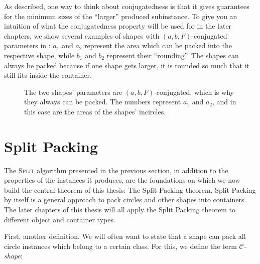 \documentclass[a4paper,style=print,bibliography=totoc,nexus,lnum,extramargin]{tubsbook}
\begin{document}
As described, one way to think about conjugatedness is that it gives guarantees for the minimum sizes of the “larger” produced subinstance. To give you an intuition of what the conjugatedness property will be used for in the later chapters, we show several examples of shapes with $(a,b,F)$-conjugated parameters in : $a_1$ and $a_2$ represent the area which can be packed into the respective shape, while $b_1$ and $b_2$ represent their “rounding”. The shapes can always be packed because if one shape gets larger, it is rounded so much that it still fits inside the container.

\begin{figure}

    \caption{The two shapes' parameters are $(a,b,F)$-conjugated, which is why they always can be packed. The numbers represent $a_1$ and $a_2$, and in this case are the areas of the shapes' incircles.}
    \label{fig:conjugated}
\end{figure}

\section{Split Packing}

The \textsc{Split} algorithm presented in the previous section, in addition to the properties of the instances it produces, are the foundations on which we now build the central theorem of this thesis: The Split Packing theorem. Split Packing by itself is a general approach to pack circles and other shapes into containers. The later chapters of this thesis will all apply the Split Packing theorem to different object and container types.

First, another definition. We will often want to state that a shape can pack all circle instances which belong to a certain class. For this, we define the term \emph{$\mathcal{C}$-shape}:
\end{document}
